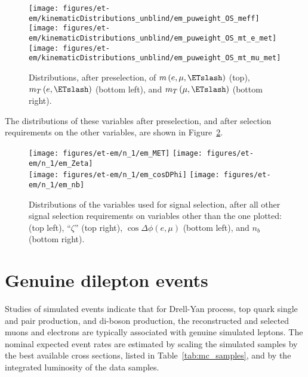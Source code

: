 \begin{figure}\centering
  \texttt{[image: figures/et-em/kinematicDistributions\_unblind/em\_puweight\_OS\_meff]} \\
  \texttt{[image: figures/et-em/kinematicDistributions\_unblind/em\_puweight\_OS\_mt\_e\_met]}
  \texttt{[image: figures/et-em/kinematicDistributions\_unblind/em\_puweight\_OS\_mt\_mu\_met]}
  \caption{\label{fig:em_preselection_distributions3} Distributions,
    after \tetm preselection, of $m\left(e, \mu, \ETslash\right)$
    (top), $m_{T}\left(e, \ETslash\right)$ (bottom left), and
    $m_{T}\left(\mu, \ETslash\right)$ (bottom right).}
\end{figure}

The distributions of these variables after preselection, and after
selection requirements on the other variables, are shown in
Figure~\ref{fig:em_nm1_distributions}.

\begin{figure}\centering
  \texttt{[image: figures/et-em/n\_1/em\_MET]}
  \texttt{[image: figures/et-em/n\_1/em\_Zeta]} \\
  \texttt{[image: figures/et-em/n\_1/em\_cosDPhi]}
  \texttt{[image: figures/et-em/n\_1/em\_nb]}
  \caption{\label{fig:em_nm1_distributions} Distributions of the
    variables used for \tetm signal selection, after all other signal
    selection requirements on variables other than the one plotted:
    \ETslash (top left), ``$\zeta$'' (top right), $\cos{\Delta \phi
      (e,\mu)}$ (bottom left), and $n_b$ (bottom right).}
\end{figure}

\section{Genuine dilepton events}
Studies of simulated events indicate that for Drell-Yan process, top
quark single and pair production, and di-boson production, the
reconstructed and selected muons and electrons are typically
associated with genuine simulated leptons.  The nominal expected event
rates are estimated by scaling the simulated samples by the best
available cross sections, listed in Table~\ref{tab:mc_samples}, and by
the integrated luminosity of the data samples.

